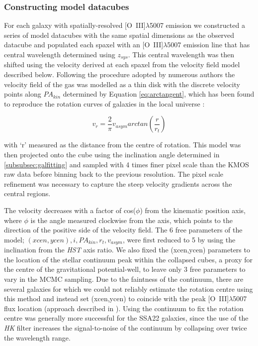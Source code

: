 \documentclass[fleqn,usenatbib]{mnras}
\begin{document}
\subsubsection{Constructing model datacubes}\label{subsubec:model_cube}
For each galaxy with spatially-resolved [O~{\sc III}]$\lambda$5007 emission we constructed a series of model datacubes with the same spatial dimensions as the observed datacube and populated each spaxel with an [O~{\sc III}]$\lambda$5007 emission line that has central wavelength determined using $z_{sys}$.
This central wavelength was then shifted using the velocity derived at each spaxel from the velocity field model described below.  
Following the procedure adopted by numerous authors \citep[e.g.][]{Epinat2010,Epinat2012,Swinbank2012,Stott2016,Mason2017} the velocity field of the gas was modelled as a thin disk with the discrete velocity points along $PA_{kin}$ determined by Equation \ref{eq:arctangent}, which has been found to reproduce the rotation curves of galaxies in the local universe \citep[e.g.][]{Courteau1997}:

\begin{equation}\label{eq:arctangent}
   v_{r} = \frac{2}{\pi}v_{asym}arctan\left(\frac{r}{r_{t}}\right)
\end{equation}

\noindent
with `r' measured as the distance from the centre of rotation.
This model was then projected onto the cube using the inclination angle determined in \cref{subsubsec:galfitting} and sampled with 4 times finer pixel scale than the KMOS raw data before binning back to the previous resolution.
The pixel scale refinement was necessary to capture the steep velocity gradients across the central regions.

\noindent
The velocity decreases with a factor of cos($\phi$) from the kinematic position axis, where $\phi$ is the angle measured clockwise from the axis, which points to the direction of the positive side of the velocity field.
The 6 free parameters of the model; $(xcen, ycen), i, PA_{kin}, r_{t}, v_{asym}$, were first reduced to 5 by using the inclination from the {\em HST} axis ratio.
We also fixed the (xcen,ycen) parameters to the location of the stellar continuum peak within the collapsed cubes, a proxy for the centre of the gravitational potential-well, to leave only 3 free parameters to vary in the MCMC sampling.
Due to the faintness of the continuum, there are several galaxies for which we could not reliably estimate the rotation centre using this method and instead set (xcen,ycen) to coincide with the peak [O~{\sc III}]$\lambda$5007 flux location (approach described in \citealt{Harrison2017}).
Using the continuum to fix the rotation centre was generally more successful for the SSA22 galaxies, since the use of the {\it HK} filter increases the signal-to-noise of the continuum by collapsing over twice the wavelength range. \\
\end{document}
